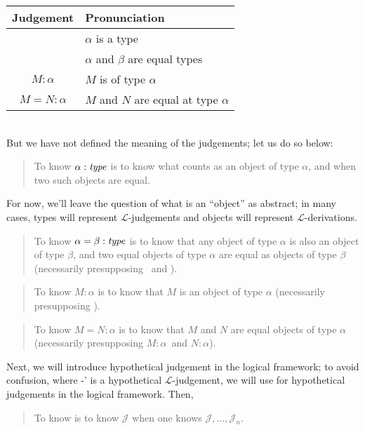 \documentclass[main.tex]{subfiles}
\begin{document}
\begin{tabular}{c|l}
Judgement & Pronunciation \\ \hline
  \type{\alpha} & $\alpha$ is a type \\
  \type{\alpha=\beta} & $\alpha$ and $\beta$ are equal types \\
  $M:\alpha$ & $M$ is of type $\alpha$ \\
  $M=N:\alpha$ & $M$ and $N$ are equal at type $\alpha$ \\
\end{tabular}\\

But we have not defined the meaning of the judgements; let us do so below:

\begin{quote}
  To know $\alpha:\mathit{type}$ is to know what counts as an object of type $\alpha$,
  and when two such objects are equal.
\end{quote}

For now, we'll leave the question of what is an ``object'' as abstract; in many
cases, types will represent $\mathcal{L}$-judgements and objects will represent
$\mathcal{L}$-derivations.

\begin{quote}
  To know $\alpha=\beta:\mathit{type}$ is to know that any object of type $\alpha$ is
  also an object of type $\beta$, and two equal objects of type $\alpha$ are
  equal as objects of type $\beta$ (necessarily presupposing \type\alpha\ and
  \type\beta).
\end{quote}

\begin{quote}
  To know $M:\alpha$ is to know that $M$ is an object of type $\alpha$
  (necessarily presupposing \type\alpha).
\end{quote}

\begin{quote}
  To know $M=N:\alpha$ is to know that $M$ and $N$ are equal objects of type
  $\alpha$ (necessarily presupposing $M:\alpha$\ and $N:\alpha$).
\end{quote}

Next, we will introduce hypothetical judgement in the logical framework; to
avoid confusion, where \hyp{}{'} is a hypothetical
$\mathcal{L}$-judgement, we will use  for
hypothetical judgements in the logical framework. Then,

\begin{quote}
  To know  is to know $\mathcal{J}$ when one knows $\mathcal{J},\dots,\mathcal{J}_n$.
\end{quote}
\end{document}

